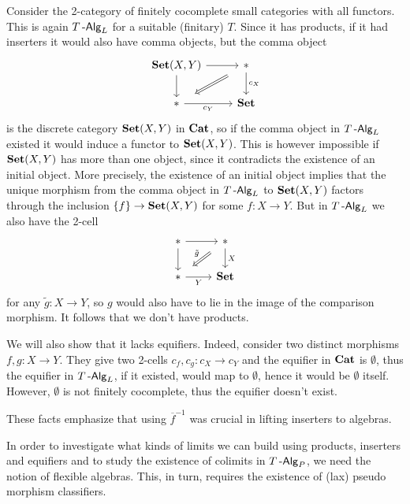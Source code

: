 \documentclass[a4paper,11pt,oneside,openany]{scrbook}
\begin{document}
\begin{exmp}
    Consider the 2-category of finitely cocomplete small categories with all
    functors. This is again $T\operatorname{-\mathsf{Alg}}_L$ for a suitable (finitary) $T$. Since it
    has products, if it had inserters it would also have comma objects, but the
    comma object
    \[\begin{tikzcd}
        {\Set(X,Y)} & {*} \\
        {*} & \Set
        \arrow["c_Y"', from=2-1, to=2-2]
        \arrow["c_X", from=1-2, to=2-2]
        \arrow[from=1-1, to=1-2]
        \arrow[from=1-1, to=2-1]
        \arrow[shorten <=11pt, shorten >=11pt, Rightarrow, from=1-2, to=2-1]
    \end{tikzcd}\]
    is the discrete category ${\normalfont\textbf{Set}}(X,Y)$ in ${\normalfont\textbf{Cat}}$, so if the comma object in
    $T\operatorname{-\mathsf{Alg}}_L$ existed it would induce a functor to ${\normalfont\textbf{Set}}(X,Y)$. This is however
    impossible if ${\normalfont\textbf{Set}}(X,Y)$ has more than one object, since it contradicts the
    existence of an initial object. More precisely, the existence of an initial
    object implies that the unique morphism from the comma object in $T\operatorname{-\mathsf{Alg}}_L$
    to ${\normalfont\textbf{Set}}(X,Y)$ factors through the inclusion $\{f\}\rightarrow{\normalfont\textbf{Set}}(X,Y)$ for
    some $f\colon X\rightarrow Y$. But in $T\operatorname{-\mathsf{Alg}}_L$ we also have the 2-cell
    \[\begin{tikzcd}
        {*} & {*} \\
        {*} & \Set
        \arrow["Y"', from=2-1, to=2-2]
        \arrow["X", from=1-2, to=2-2]
        \arrow[from=1-1, to=1-2]
        \arrow[from=1-1, to=2-1]
        \arrow["{\tilde{g}}"', shorten <=8pt, shorten >=8pt, Rightarrow, from=1-2, to=2-1]
    \end{tikzcd}\]
    for any $\tilde{g}\colon X\rightarrow Y$, so $g$ would also have to lie in
    the image of the comparison morphism. It follows that we don't have
    products.

    We will also show that it lacks equifiers. Indeed, consider two distinct
    morphisms $f,g\colon X\rightarrow Y$. They give two 2-cells $c_f,c_g\colon
    c_X\rightarrow c_Y$ and the equifier in ${\normalfont\textbf{Cat}}$ is $\emptyset$, thus the
    equifier in $T\operatorname{-\mathsf{Alg}}_L$, if it existed, would map to $\emptyset$, hence it
    would be $\emptyset$ itself. However, $\emptyset$ is not finitely
    cocomplete, thus the equifier doesn't exist.
\end{exmp}

These facts emphasize that using $\overline{f}^{-1}$ was crucial in lifting
inserters to algebras.

In order to investigate what kinds of limits we can build using products,
inserters and equifiers and to study the existence of colimits in $T\operatorname{-\mathsf{Alg}}_P$, we
need the notion of flexible algebras. This, in turn, requires the existence of
(lax) pseudo morphism classifiers.
\end{document}
